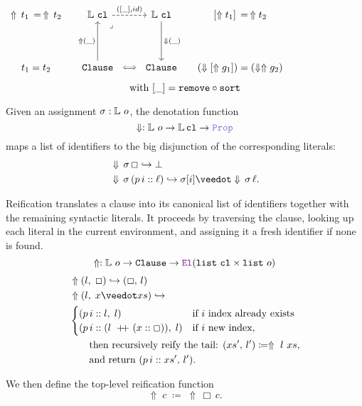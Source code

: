 \begin{center}
\(\begin{tikzcd}[ampersand replacement=\&,column sep=small]
	{\Uparrow\,t_1 \,=\, \Uparrow\,t_2} \& \bb{L}~\kw{cl} \&\& \bb{L}~\kw{cl} \& {[\Uparrow t_1] \,=\, \Uparrow t_2} \\
	\\
	{t_1 = t_2} \& \kw{Clause} \&\& \kw{Clause} \& {(\den{[\Uparrow g_1]}) = (\den{\Uparrow g_2})}
	\arrow["({[\_], id)}", dashed, from=1-2, to=1-4]
	\arrow["\lrcorner"{anchor=center, pos=0.125}, draw=none, from=1-2, to=3-4]
	\arrow["{\Downarrow(\_)}", from=1-4, to=3-4]
	\arrow["{\Uparrow(\_)}", from=3-2, to=1-2]
	\arrow["\iff"{description}, dotted, no head, from=3-2, to=3-4]
\end{tikzcd}\)
\[
  \text{with } [\_] = \texttt{\upshape{remove}} \circ \texttt{\upshape{sort}}
\]
\end{center}


\begin{definition}[Denotation]\label{def:denotation}
Given an assignment $\sigma : \mathbb{L}~o$, the denotation function
\[
  \Downarrow : \bb{L}~o \to \bb{L}\,\kw{cl} \to \prop
\]
maps a list of identifiers to the big disjunction of the corresponding literals:
\begin{align*}
&\Downarrow\,\sigma\,\Box \re \bot \\
&\Downarrow\,\sigma\,(p\,i :: \ell) \re \sigma[i] \mathbin{\veedot} \Downarrow\,\sigma\,\ell.
\end{align*}
\end{definition}

\begin{definition}\label{def:reify}
Reification translates a clause into its canonical list of identifiers together with 
the remaining syntactic literals. It proceeds by traversing the clause, 
looking up each literal in the current environment, and assigning it a fresh identifier if none is found.
\[
  \Uparrow  : \bb{L}~o \to \kw{Clause} \to \el (\kw{list}~\kw{cl} \times \kw{list}~o)
\]
\begin{align*}
&\Uparrow (l,\;\Box) \re (\Box,\,l) \\
&\Uparrow (l,\; x \veedot xs) \re \\
&\begin{cases}
  (p\,i :: l,\; l) & \text{if }  i \text{ index already exists} \\
  (p\,i :: (l \concat (x::\Box)),\; l) & \text{if } i \text{ new index},
\end{cases} \\
&\qquad \text{then recursively reify the tail: } (xs',\,l') \coloneq \Uparrow~l~xs, \\
&\qquad \text{and return } (p\,i :: xs',\, l').
\end{align*}

\noindent
We then define the top-level reification function
\[
  \Uparrow \;c \;\coloneqq\; \Uparrow \,\Box\,c.
\]
\end{definition}

